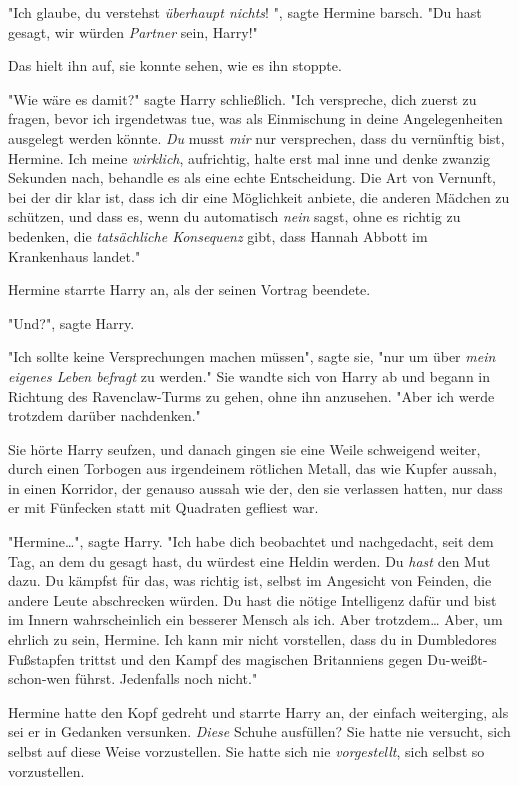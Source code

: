 {"Ich glaube, du verstehst \emph{überhaupt nichts}! ", sagte Hermine barsch. "Du hast gesagt, wir würden \emph{Partner} sein, Harry!"

Das hielt ihn auf, sie konnte sehen, wie es ihn stoppte.

"Wie wäre es damit?" sagte Harry schließlich. "Ich verspreche, dich zuerst zu fragen, bevor ich irgendetwas tue, was als Einmischung in deine Angelegenheiten ausgelegt werden könnte. \emph{Du} musst \emph{mir} nur versprechen, dass du vernünftig bist, Hermine. Ich meine \emph{wirklich}, aufrichtig, halte erst mal inne und denke zwanzig Sekunden nach, behandle es als eine echte Entscheidung. Die Art von Vernunft, bei der dir klar ist, dass ich dir eine Möglichkeit anbiete, die anderen Mädchen zu schützen, und dass es, wenn du automatisch \emph{nein} sagst, ohne es richtig zu bedenken, die \emph{tatsächliche Konsequenz} gibt, dass Hannah Abbott im Krankenhaus landet."

Hermine starrte Harry an, als der seinen Vortrag beendete.

"Und?", sagte Harry.

"Ich sollte keine Versprechungen machen müssen", sagte sie, "nur um über \emph{mein eigenes Leben befragt} zu werden." Sie wandte sich von Harry ab und begann in Richtung des Ravenclaw-Turms zu gehen, ohne ihn anzusehen. "Aber ich werde trotzdem darüber nachdenken."

Sie hörte Harry seufzen, und danach gingen sie eine Weile schweigend weiter, durch einen Torbogen aus irgendeinem rötlichen Metall, das wie Kupfer aussah, in einen Korridor, der genauso aussah wie der, den sie verlassen hatten, nur dass er mit Fünfecken statt mit Quadraten gefliest war.

"Hermine…", sagte Harry. "Ich habe dich beobachtet und nachgedacht, seit dem Tag, an dem du gesagt hast, du würdest eine Heldin werden. Du \emph{hast} den Mut dazu. Du kämpfst für das, was richtig ist, selbst im Angesicht von Feinden, die andere Leute abschrecken würden. Du hast die nötige Intelligenz dafür und bist im Innern wahrscheinlich ein besserer Mensch als ich. Aber trotzdem… Aber, um ehrlich zu sein, Hermine. Ich kann mir nicht vorstellen, dass du in Dumbledores Fußstapfen trittst und den Kampf des magischen Britanniens gegen Du-weißt-schon-wen führst. Jedenfalls noch nicht."

Hermine hatte den Kopf gedreht und starrte Harry an, der einfach weiterging, als sei er in Gedanken versunken. \emph{Diese} Schuhe ausfüllen? Sie hatte nie versucht, sich selbst auf diese Weise vorzustellen. Sie hatte sich nie \emph{vorgestellt}, sich selbst so vorzustellen.

}
